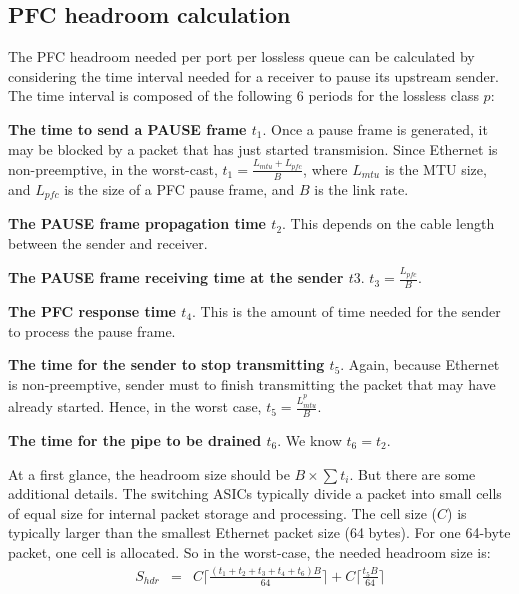 \begin{appendices}
\section{PFC headroom calculation}\label{APPHEADROOM}

The PFC headroom needed per port per lossless queue can be calculated by
		considering the time interval needed for a receiver to pause its
		upstream sender. The time interval is composed of the following 6
		periods for the lossless class $p$:

	
\noindent\textbf{The time to send a PAUSE frame $t_1$}.  Once a pause frame is
		generated, it may be blocked by a packet that has just started
		transmision. Since Ethernet is non-preemptive, in the worst-cast,
		$t_1 = \frac{ L_{mtu} + L_{pfc}}{B}$, where $L_{mtu}$ is the MTU size,
		and $L_{pfc}$ is the size of a PFC pause frame, and $B$ is the link
		rate.


\noindent\textbf{The PAUSE frame propagation time $t_2$}. This depends on 
		the cable length between the sender and receiver.

\noindent\textbf{The PAUSE frame receiving time at the sender $t3$}.
		$t_3=\frac{L_{pfc}}{B}$.

\noindent\textbf{The PFC response time $t_4$}. This is the amount of time needed
		for the sender to process the pause frame.

\noindent\textbf{The time for the sender to stop transmitting $t_5$}. Again,
		because Ethernet is non-preemptive, sender must to finish 
		transmitting the packet that may have already started. Hence, in the
		worst case, $t_5 =
		\frac{L^{p}_{mtu}}{B}$.

\noindent\textbf{The time for the pipe to be drained $t_6$}. We know $t_6 =
		t_2$.


At a first glance, the headroom size should be $B\times\sum t_i$. But there are
some additional details. The switching ASICs typically divide a packet
into small cells of equal size for internal packet storage and
processing. The cell size ($C$) is typically larger than the smallest
Ethernet packet size (64 bytes). For one 64-byte packet, one cell is
allocated. So in the worst-case, the needed headroom size is:
\begin{eqnarray} \label{eqn:pfcheadroom} S_{hdr} & = &
C\lceil\frac{(t_1+t_2+t_3+t_4 + t_6)B}{64}\rceil + C\lceil \frac{t_5
B}{64}\rceil \nonumber \end{eqnarray}


\end{appendices}
